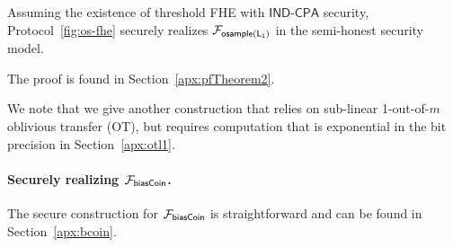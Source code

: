 \begin{theorem} \label{thm:os-fhe}
Assuming the existence of threshold FHE with
$\mathsf{IND}\mbox{-}\mathsf{CPA}$ security,
Protocol~\ref{fig:os-fhe} securely realizes $\mathcal{F}_{{\mathsf{osample(L_1)}}}$ in the
semi-honest security model. 
\end{theorem} 
The proof is found in Section~\ref{apx:pfTheorem2}.

We note that we give another construction that relies on sub-linear
1-out-of-$m$ oblivious transfer (OT), but requires computation that is
exponential in the bit precision in Section~\ref{apx:otl1}.  

\paragraph{Securely realizing $\mathcal{F}_{\mathsf{biasCoin}}$.} The secure construction for
$\mathcal{F}_{\mathsf{biasCoin}}$ is straightforward and can be found in Section~\ref{apx:bcoin}. 

